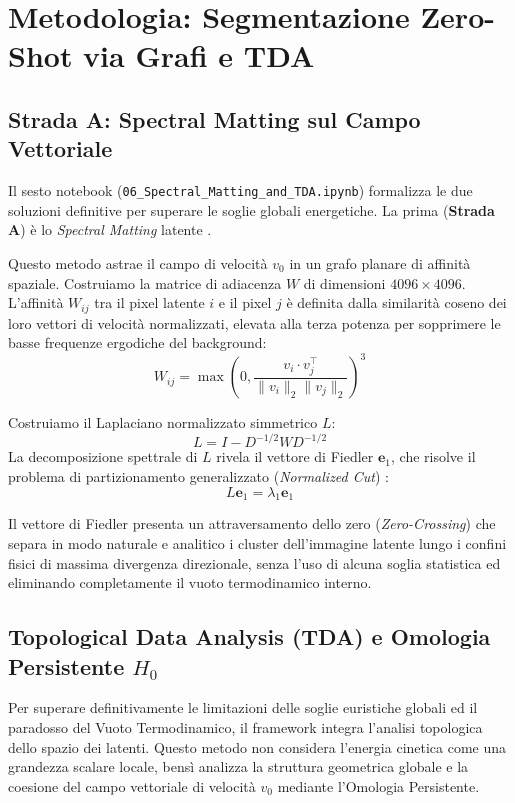 \documentclass[12pt,a4paper]{report}
\begin{document}
\chapter{Metodologia: Segmentazione Zero-Shot via Grafi e TDA}
\section{Strada A: Spectral Matting sul Campo Vettoriale}
Il sesto notebook (\texttt{06\_Spectral\_Matting\_and\_TDA.ipynb}) formalizza le due soluzioni definitive per superare le soglie globali energetiche. La prima (\textbf{Strada A}) è lo \textit{Spectral Matting} latente \cite{levin2008spectral}.

Questo metodo astrae il campo di velocità $v_0$ in un grafo planare di affinità spaziale. Costruiamo la matrice di adiacenza $W$ di dimensioni $4096 \times 4096$. L'affinità $W_{ij}$ tra il pixel latente $i$ e il pixel $j$ è definita dalla similarità coseno dei loro vettori di velocità normalizzati, elevata alla terza potenza per sopprimere le basse frequenze ergodiche del background:
\begin{equation}
    W_{ij} = \max\left( 0, \frac{v_i \cdot v_j^\top}{\|v_i\|_2 \|v_j\|_2} \right)^3
\end{equation}

Costruiamo il Laplaciano normalizzato simmetrico $L$:
\begin{equation}
    L = I - D^{-1/2} W D^{-1/2}
\end{equation}
La decomposizione spettrale di $L$ rivela il vettore di Fiedler $\mathbf{e}_1$, che risolve il problema di partizionamento generalizzato (\textit{Normalized Cut}) \cite{shi2000normalized}:
\begin{equation}
    L \mathbf{e}_1 = \lambda_1 \mathbf{e}_1
\end{equation}

Il vettore di Fiedler presenta un attraversamento dello zero (\textit{Zero-Crossing}) che separa in modo naturale e analitico i cluster dell'immagine latente lungo i confini fisici di massima divergenza direzionale, senza l'uso di alcuna soglia statistica ed eliminando completamente il vuoto termodinamico interno.

\section{Topological Data Analysis (TDA) e Omologia Persistente $H_0$}
Per superare definitivamente le limitazioni delle soglie euristiche globali ed il paradosso del Vuoto Termodinamico, il framework integra l'analisi topologica dello spazio dei latenti.
Questo metodo non considera l'energia cinetica come una grandezza scalare locale, bensì analizza la struttura geometrica globale e la coesione del campo vettoriale di velocità $v_0$ mediante l'Omologia Persistente.
\end{document}
